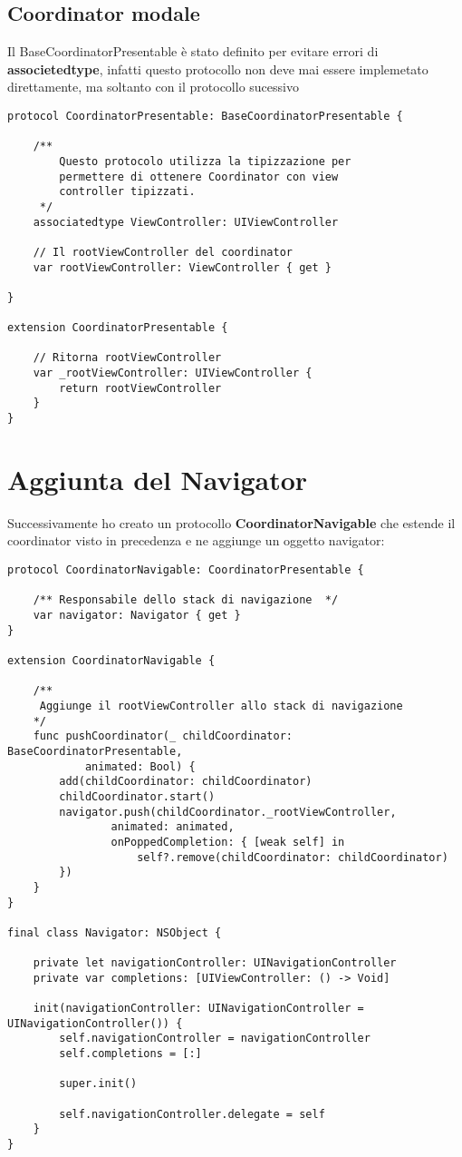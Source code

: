 \subsection{Coordinator modale}

Il BaseCoordinatorPresentable è stato definito per evitare errori di \textbf{associetedtype},
infatti questo protocollo non deve mai essere implemetato direttamente, ma soltanto con il protocollo sucessivo

\begin{verbatim}
protocol CoordinatorPresentable: BaseCoordinatorPresentable {

    /**
        Questo protocolo utilizza la tipizzazione per
        permettere di ottenere Coordinator con view
        controller tipizzati.
     */
    associatedtype ViewController: UIViewController

    // Il rootViewController del coordinator
    var rootViewController: ViewController { get }

}

extension CoordinatorPresentable {

    // Ritorna rootViewController
    var _rootViewController: UIViewController {
        return rootViewController
    }
}
\end{verbatim}

\section{Aggiunta del Navigator}

Successivamente ho creato un protocollo \textbf{CoordinatorNavigable} che estende 
il coordinator visto in precedenza e ne aggiunge un oggetto navigator:

\begin{verbatim}
protocol CoordinatorNavigable: CoordinatorPresentable {
    
    /** Responsabile dello stack di navigazione  */
    var navigator: Navigator { get }
}

extension CoordinatorNavigable {
    
    /**
     Aggiunge il rootViewController allo stack di navigazione
    */
    func pushCoordinator(_ childCoordinator: BaseCoordinatorPresentable,
            animated: Bool) {
        add(childCoordinator: childCoordinator)
        childCoordinator.start()
        navigator.push(childCoordinator._rootViewController,
                animated: animated,
                onPoppedCompletion: { [weak self] in
                    self?.remove(childCoordinator: childCoordinator)
        })
    }
}

final class Navigator: NSObject {

    private let navigationController: UINavigationController
    private var completions: [UIViewController: () -> Void]
    
    init(navigationController: UINavigationController = UINavigationController()) {
        self.navigationController = navigationController
        self.completions = [:]
        
        super.init()
        
        self.navigationController.delegate = self
    }
}
\end{verbatim}

